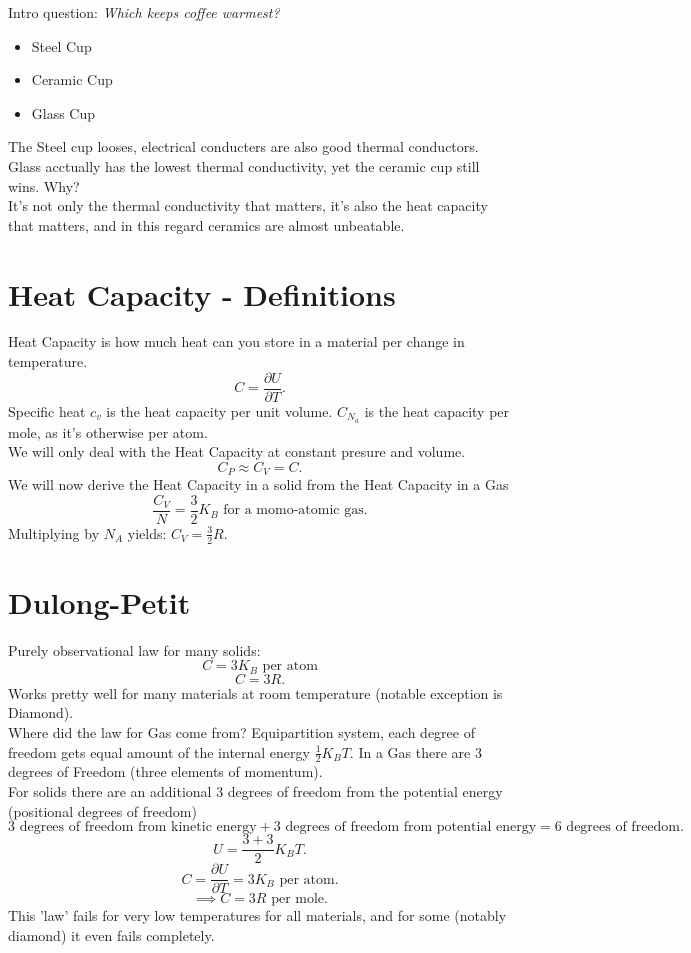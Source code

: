 \documentclass{report}
\begin{document}
Intro question: \emph{Which keeps coffee warmest?}
\begin{itemize}
	\item Steel Cup \\
	\item Ceramic Cup \\
	\item Glass Cup 
\end{itemize}
The Steel cup looses, electrical conducters are also good thermal conductors. Glass acctually has the lowest thermal conductivity, yet the ceramic cup still wins. Why? \\
It's not only the thermal conductivity that matters, it's also the heat capacity that matters, and in this regard ceramics are almost unbeatable.\\
\section{Heat Capacity - Definitions}
Heat Capacity is how much heat can you store in a material per change in temperature. \[
C = \frac{\partial U}{\partial T}
.\] Specific heat $c_v$ is the heat capacity per unit volume. $C_{N_a}$ is the heat capacity per mole, as it's otherwise per atom. \\
We will only deal with the Heat Capacity at constant presure and volume. \[
C_P \approx C_V = C
.\] We will now derive the Heat Capacity in a solid from the Heat Capacity in a Gas \[
\frac{C_V}{N} = \frac{3}{2} K_B \text{ for a momo-atomic gas}
.\]
Multiplying by $N_A$ yields: $C_V = \frac{3}{2} R$.
\section{Dulong-Petit}
Purely observational law for many solids: \[
C = 3 K_B \text{ per atom}
\] \[
C = 3 R
.\] Works pretty well for many materials at room temperature (notable exception is Diamond).\\
Where did the law for Gas come from? Equipartition system, each degree of freedom gets equal amount of the internal energy $\frac{1}{2} K_B T$. In a Gas there are $3$ degrees of Freedom (three elements of momentum). \\
For solids there are an additional $3$ degrees of freedom from the potential energy (positional degrees of freedom) \[
3 \text{ degrees of freedom from kinetic energy} + 3 \text{ degrees of freedom from potential energy}= 6 \text{ degrees of freedom}
.\] \[
U = \frac{3+3}{2} K_B T
.\] \[
C = \frac{\partial U}{\partial T} = 3 K_B \text{ per atom}
.\]  \[
\implies C = 3 R \text{ per mole}
.\] 
This 'law' fails for very low temperatures for all materials, and for some (notably diamond) it even fails completely.
\end{document}
